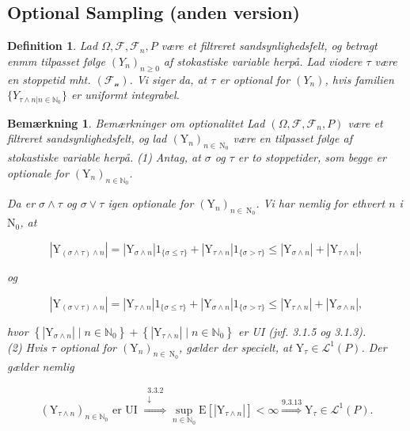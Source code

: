 \documentclass{article}
\newcommand{\N}{\mathbb{N}}
\newcommand{\1}{\mathbbm{1}}
\theoremstyle{boxed}
\newtheorem{definition}[theorem]{Definition}
\newtheorem{remark}[theorem]{Bemærkning}
\begin{document}
\subsection{Optional Sampling (anden version)}
\begin{theorem-box}
    \begin{definition}
        Lad $\Omega, \mathcal{F}, \mathcal{F}_n, P$ være et filtreret sandsynlighedsfelt, og betragt enmm tilpasset følge $(Y_n)_{n\geq 0}$ af stokastiske variable herpå. Lad viodere $\tau$ være en stoppetid mht. $(\mathcal{F_n})$. Vi siger da, at $\tau$ er optional for $(Y_n)$, hvis familien $\{Y_{\tau \wedge n|n\in\N_0}\}$ er uniformt integrabel.
    \end{definition}
\end{theorem-box}
\begin{remark}
Bemærkninger om optionalitet
Lad $\left(\Omega, \mathcal{F}, \mathcal{F}_n, P\right)$ være et filtreret sandsynlighedsfelt, og lad $\left(\mathrm{Y}_n\right)_{n \in \mathrm{~N}_0}$ være en tilpasset følge af stokastiske variable herpå.
(1) Antag, at $\sigma$ og $\tau$ er to stoppetider, som begge er optionale for $\left(\mathrm{Y}_n\right)_{n \in \mathbb{N}_0}$.

Da er $\sigma \wedge \tau$ og $\sigma \vee \tau$ igen optionale for $\left(\mathrm{Y}_n\right)_{n \in \mathrm{~N}_0}$.
Vi har nemlig for ethvert $n$ i $\mathrm{N}_0$, at

$$
\left|\mathrm{Y}_{(\sigma \wedge \tau) \wedge n}\right|=\left|\mathrm{Y}_{\sigma \wedge n}\right| 1_{\{\sigma \leq \tau\}}+\left|\mathrm{Y}_{\tau \wedge n}\right| 1_{\{\sigma>\tau\}} \leq\left|\mathrm{Y}_{\sigma \wedge n}\right|+\left|\mathrm{Y}_{\tau \wedge n}\right|,
$$

og

$$
\left|\mathrm{Y}_{(\sigma \vee \tau) \wedge n}\right|=\left|\mathrm{Y}_{\tau \wedge n}\right| 1_{\{\sigma \leq \tau\}}+\left|\mathrm{Y}_{\sigma \wedge n}\right| 1_{\{\sigma>\tau\}} \leq\left|\mathrm{Y}_{\tau \wedge n}\right|+\left|\mathrm{Y}_{\sigma \wedge n}\right|,
$$

hvor $\left\{\left|\mathrm{Y}_{\sigma \wedge n}\right| \mid n \in \mathbb{N}_0\right\}+\left\{\left|\mathrm{Y}_{\tau \wedge n}\right| \mid n \in \mathbb{N}_0\right\}$ er UI (jvf. 3.1.5 og 3.1.3).
\\(2) Hvis $\tau$ optional for $\left(\mathrm{Y}_n\right)_{n \in \mathrm{~N}_0}$, gælder der specielt, at $\mathrm{Y}_\tau \in \mathcal{L}^1(P)$. Der gælder nemlig

$$
\left(\mathrm{Y}_{\tau \wedge n}\right)_{n \in \mathbb{N}_0} \text { er UI } \stackrel{\substack{3.3.2 \\ \downarrow}}{\Longrightarrow} \sup _{n \in \mathbb{N}_0} \mathrm{E}\left[\left|\mathrm{Y}_{\tau \wedge n}\right|\right]<\infty \stackrel{9.3.13}{\Longrightarrow} \mathrm{Y}_\tau \in \mathcal{L}^1(P) .
$$

\end{remark}
\end{document}
